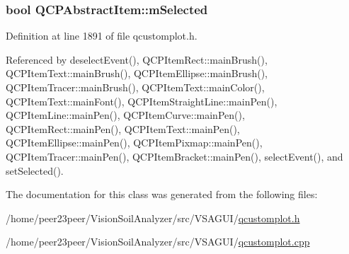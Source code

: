 \hypertarget{class_q_c_p_abstract_item_a4bdb3457dad1d268c0f78a44152b9645}{}
\subsubsection[{m\+Selected}]{\setlength{\rightskip}{0pt plus 5cm}bool Q\+C\+P\+Abstract\+Item\+::m\+Selected\hspace{0.3cm}{\ttfamily [protected]}}\label{class_q_c_p_abstract_item_a4bdb3457dad1d268c0f78a44152b9645}


Definition at line 1891 of file qcustomplot.\+h.



Referenced by deselect\+Event(), Q\+C\+P\+Item\+Rect\+::main\+Brush(), Q\+C\+P\+Item\+Text\+::main\+Brush(), Q\+C\+P\+Item\+Ellipse\+::main\+Brush(), Q\+C\+P\+Item\+Tracer\+::main\+Brush(), Q\+C\+P\+Item\+Text\+::main\+Color(), Q\+C\+P\+Item\+Text\+::main\+Font(), Q\+C\+P\+Item\+Straight\+Line\+::main\+Pen(), Q\+C\+P\+Item\+Line\+::main\+Pen(), Q\+C\+P\+Item\+Curve\+::main\+Pen(), Q\+C\+P\+Item\+Rect\+::main\+Pen(), Q\+C\+P\+Item\+Text\+::main\+Pen(), Q\+C\+P\+Item\+Ellipse\+::main\+Pen(), Q\+C\+P\+Item\+Pixmap\+::main\+Pen(), Q\+C\+P\+Item\+Tracer\+::main\+Pen(), Q\+C\+P\+Item\+Bracket\+::main\+Pen(), select\+Event(), and set\+Selected().



The documentation for this class was generated from the following files\+:\begin{DoxyCompactItemize}
\item 
/home/peer23peer/\+Vision\+Soil\+Analyzer/src/\+V\+S\+A\+G\+U\+I/\hyperlink{qcustomplot_8h}{qcustomplot.\+h}\item 
/home/peer23peer/\+Vision\+Soil\+Analyzer/src/\+V\+S\+A\+G\+U\+I/\hyperlink{qcustomplot_8cpp}{qcustomplot.\+cpp}\end{DoxyCompactItemize}
